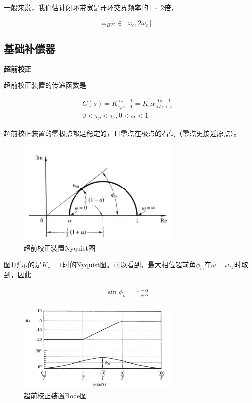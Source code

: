 一般来说，我们估计闭环带宽是开环交界频率的$1\sim2$倍，

\begin{equation*}
    \omega_{BW}\in[\omega_c,2\omega_c]
\end{equation*}

\subsection{基础补偿器}

\textbf{超前校正}

超前校正装置的传递函数是

\begin{gather*}
    C(s)=K\frac{\tau_z s+1}{\tau_p s+1}=K_c\alpha \frac{Ts+1}{\alpha Ts+1}\\ 
    0<\tau_p<\tau_z, 0<\alpha<1
\end{gather*}

超前校正装置的零极点都是稳定的，且零点在极点的右侧（零点更接近原点）。

\begin{figure}[!ht]
    \centering
    \includegraphics[width=8cm]{figures/30.png}
    \caption{超前校正装置Nyquist图}
    \label{30}
\end{figure}

图\ref{30}所示的是$K_c=1$时的Nyquist图。可以看到，最大相位超前角$\phi_m$在$\omega=\omega_M$时取到，因此

\begin{gather*}
    \sin\phi_m=\frac{1-\alpha}{1+\alpha}
\end{gather*}

\begin{figure}[!ht]
    \centering
    \includegraphics[width=8cm]{figures/31.png}
    \caption{超前校正装置Bode图}
    \label{31}
\end{figure}

